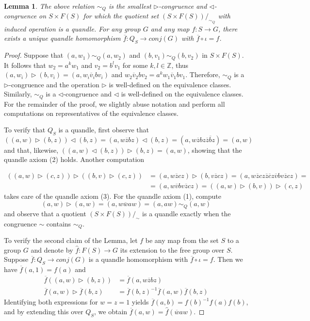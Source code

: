 \documentclass[a4paper,12pt]{amsart}
\numberwithin{equation}{section}
\theoremstyle{plain}
\newtheorem{lemma}[theorem]{Lemma}
\theoremstyle{definition}
\newcommand{\ZZ}{\mathbb{Z}}
\newcommand{\tr}{\triangleright}
\newcommand{\tl}{\triangleleft}
\begin{document}
\begin{lemma} 
	The above relation $\sim _{Q}$ is the smallest $\tr $-congruence and $\tl $-congruence on $S\times F(S)$ for which the quotient set $(S\times F(S))/_{\sim _{Q}}$ with induced operation is a quandle.
	For any group $G$ and any map $f\colon S\to G$, there exists a unique quandle homomorphism $\overline{f}\colon Q_{S}\to conj(G)$ with $\overline{f}\circ \iota =f$.  
\end{lemma}
\begin{proof}
	Suppose that $(a,w_1)\sim _{Q}(a,w_2)$ and $(b,v_1)\sim _{Q}(b,v_2)$ in $S\times F(S)$. 
	It follows that $w_{2}=a^{k}w_{1}$ and $v_{2}=b^{l}v_{1}$ for some $k,l\in \ZZ $, thus $(a,w_i)\tr (b,v_i)=(a,w_{i}\overline{v}_{i}bv_{i})$ and $w_{2}\overline{v}_{2}bv_{2}=a^{k}w_{1}\overline{v}_{1}bv_{1}$. 
	Therefore, $\sim _{Q}$ is a $\tr $-congruence and the operation $\tr $ is well-defined on the equivalence classes.
	Similarly, $\sim _Q$ is a $\tl $-congruence and $\tl$ is well-defined on the equivalence classes.
	For the remainder of the proof, we slightly abuse notation and perform all computations on representatives of the equivalence classes. 


	To verify that $Q_S$ is a quandle, first observe that 
	$$((a,w) \tr (b,z)) \tl (b,z) = (a,w\overline{z}bz) \tl (b,z) = (a, w \overline{z} b z \overline{z} \overline{b} z) = (a,w)$$
	and that, likewise, $((a,w) \tl (b,z)) \tr (b,z) = (a,w)$, showing that the quandle axiom (2) holds.
	Another computation

	\begin{align*}
		\left ((a, w)\tr (c, z)\right )\tr \left ((b, v)\tr (c, z)\right ) &=(a, w\overline{z}cz)\tr (b,v\overline{z}cz) =(a,w\overline{z}cz\overline{z}\overline{c}z\overline{v}bv\overline{z}cz)=\\
		& =(a,w\overline{v}bv\overline{z}cz)=\left ((a,w)\tr (b,v)\right )\tr (c,z)
	\end{align*}
	takes care of the quandle axiom (3). For the quandle axiom (1), compute 
	$$(a,w)\tr (a,w)=(a,w\overline{w}aw)=(a,aw)\sim _{Q}(a,w)$$ 
	and observe that a quotient $(S\times F(S))/_{\sim }$ is a quandle exactly when the congruence $\sim $ contains $\sim _{Q}$. 


	To verify the second claim of the Lemma, let $f$ be any map from the set $S$ to a group $G$ and denote by $\widehat{f}\colon F(S)\to G$ its extension to the free group over $S$. 
	Suppose $\overline{f}\colon Q_{S}\to conj(G)$ is a quandle homomorphism with $\overline{f}\circ \iota =f$.
	Then we have $\overline{f}(a,1)=f(a)$ and
	\begin{align*}
		\overline{f}\left ((a,w)\tr (b,z)\right )&=\overline{f}(a,w\overline{z}bz)\\
		\overline{f}(a,w)\tr \overline{f}(b,z)&=\overline{f}(b,z)^{-1}\overline{f}(a,w)\overline{f}(b,z)
	\end{align*}
	Identifying both expressions for $w=z=1$ yields $\overline{f}(a,b)=f(b)^{-1}f(a)f(b)$, and by extending this over $Q_S$, we obtain $\overline{f}(a,w)=\widehat{f}(\overline{w}aw)$. 
\end{proof}
\end{document}

